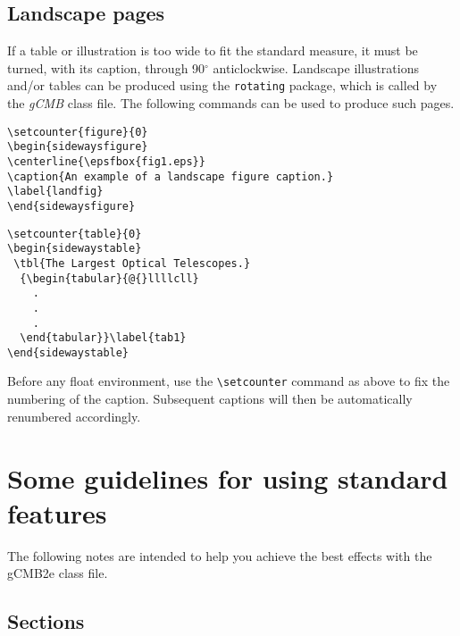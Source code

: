 \documentclass{gCMB2e}
\begin{document}
\subsection{Landscape pages}\label{eps}

If a table or illustration is too wide to fit the standard measure, it must be turned, with its caption,
through 90$^{\circ}$ anticlockwise. Landscape illustrations and/or tables can be produced using
the \verb"rotating" package, which is called by the \textit{gCMB} class file. The following commands can
be used to produce such pages.
%
\begin{verbatim}
\setcounter{figure}{0}
\begin{sidewaysfigure}
\centerline{\epsfbox{fig1.eps}}
\caption{An example of a landscape figure caption.}
\label{landfig}
\end{sidewaysfigure}
\end{verbatim}

\begin{verbatim}
\setcounter{table}{0}
\begin{sidewaystable}
 \tbl{The Largest Optical Telescopes.}
  {\begin{tabular}{@{}llllcll}
    .
    .
    .
  \end{tabular}}\label{tab1}
\end{sidewaystable}
\end{verbatim}
%
Before any float environment, use the \verb"\setcounter" command
as above to fix the numbering of the caption. Subsequent captions
will then be automatically renumbered accordingly.


\section{Some guidelines for using standard features}

The following notes are intended to help you achieve the best effects with the gCMB2e class file.


\subsection{Sections}
\end{document}
